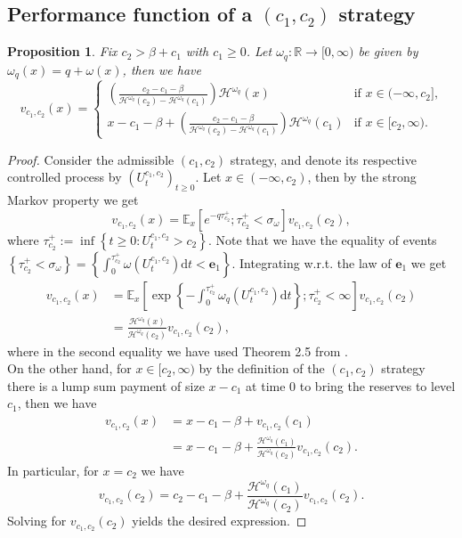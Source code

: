 \documentclass[11pt,reqno]{amsart}
\newtheorem{proposition}{Proposition}[section]
\newcommand{\e}{\mathbb{E}}
\newcommand{\reals}{\mathbb{R}}
\newcommand{\diff}{\mathrm{d}}
\newcommand{\cH}{\mathcal{H}}
\newcommand{\homega}{\omega_q}
\newcommand{\BRA}[1]{{{\left\{#1\right\}}}} %
\newcommand{\PAR}[1]{{{\left(#1\right)}}} %
\newcommand{\SBRA}[1]{{{\left[#1\right]}}} %
\renewcommand{\geq}{\geqslant}
\begin{document}
\subsection{Performance function of a $(c_1,c_2)$ strategy}
\begin{proposition}\label{prop:perf-barrier}
	Fix $c_2 > \beta + c_1 $ with $c_1\geq 0$. Let $\homega : \reals \to [0,\infty)$ be given by $\homega(x) = q + \omega(x)$, then we have
	\[
	v_{c_1,c_2} (x) =
	\begin{cases}
		\PAR{\frac{c_2-c_1-\beta}{\cH^{\homega}(c_2) - \cH^{\homega}(c_1)}} \cH^{\homega}(x) & \text{if $x \in (-\infty,c_2]$,} \\
		x-c_1-\beta + \PAR{\frac{c_2-c_1-\beta}{\cH^{\homega}(c_2) - \cH^{\homega}(c_1)}} \cH^{\homega}(c_1) & \text{if $x \in [c_2, \infty)$.}
	\end{cases}
	\]
\end{proposition}
\begin{proof}
Consider the admissible $(c_1,c_2)$ strategy, and denote its respective controlled process by $(U^{c_1,c_2}_t)_{t\geq 0}$. Let $x \in (-\infty,c_2)$, then by the strong Markov property we get
\[
v_{c_1,c_2}(x) = \e_x\SBRA{e^{-q\tau_{c_2}^+} ; \tau_{c_2}^+ < \sigma_{\omega}}v_{c_1,c_2}(c_2),
\]
where $\tau_{c_2}^+ := \inf\BRA{t\geq 0: U^{c_1,c_2}_t > c_2}$. Note that we have the equality of events $\BRA{ \tau_{c_2}^+ < \sigma_{\omega} } = \BRA{ \int_0^{\tau_{c_2}^+} \omega(U^{c_1,c_2}_t) \diff t < \mathbf{e}_1}$. Integrating w.r.t. the law of $\mathbf{e}_1$ we get
\begin{align*}
	v_{c_1,c_2}(x) &= \e_x\SBRA{ \exp\BRA{-\int_0^{\tau_{c_2}^+} \homega(U^{c_1,c_2}_t) \diff t} ; \tau_{c_2}^+ < \infty }v_{c_1,c_2}(c_2)\\
	&= \frac{\cH^{\homega}(x)}{\cH^{\homega}(c_2)}v_{c_1,c_2}(c_2),
\end{align*}
where in the second equality we have used Theorem 2.5 from \cite{li-palmowski_2018}.\\
On the other hand, for $x \in [c_2,\infty)$ by the definition of the $(c_1,c_2)$ strategy there is a lump sum payment of size $x-c_1$ at time 0 to bring the reserves to level $c_1$, then we have
\begin{align*}
v_{c_1,c_2}(x) &= x - c_1 -\beta + v_{c_1,c_2}(c_1)\\
&= x - c_1 - \beta + \frac{\cH^{\homega}(c_1)}{\cH^{\homega}(c_2)}v_{c_1,c_2}(c_2).
\end{align*}
In particular, for $x = c_2$ we have
\[
v_{c_1,c_2}(c_2) = c_2-c_1-\beta + \frac{\cH^{\homega}(c_1)}{\cH^{\homega}(c_2)}v_{c_1,c_2}(c_2).
\]
Solving for $v_{c_1,c_2}(c_2)$ yields the desired expression.
\end{proof}
\end{document}
